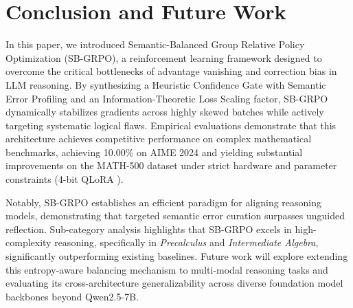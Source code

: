 \section{Conclusion and Future Work}
In this paper, we introduced Semantic-Balanced Group Relative Policy Optimization (SB-GRPO), a reinforcement learning framework designed to overcome the critical bottlenecks of advantage vanishing and correction bias in LLM reasoning. By synthesizing a Heuristic Confidence Gate with Semantic Error Profiling and an Information-Theoretic Loss Scaling factor, SB-GRPO dynamically stabilizes gradients across highly skewed batches while actively targeting systematic logical flaws. Empirical evaluations demonstrate that this architecture achieves competitive performance on complex mathematical benchmarks, achieving 10.00\% on AIME 2024 and yielding substantial improvements on the MATH-500 dataset under strict hardware and parameter constraints (4-bit QLoRA \cite{hu2021loralowrankadaptationlarge,dettmers2023qloraefficientfinetuningquantized}). 

Notably, SB-GRPO establishes an efficient paradigm for aligning reasoning models, demonstrating that targeted semantic error curation surpasses unguided reflection. Sub-category analysis highlights that SB-GRPO excels in high-complexity reasoning, specifically in \textit{Precalculus} and \textit{Intermediate Algebra}, significantly outperforming existing baselines. Future work will explore extending this entropy-aware balancing mechanism to multi-modal reasoning tasks and evaluating its cross-architecture generalizability across diverse foundation model backbones beyond Qwen2.5-7B.